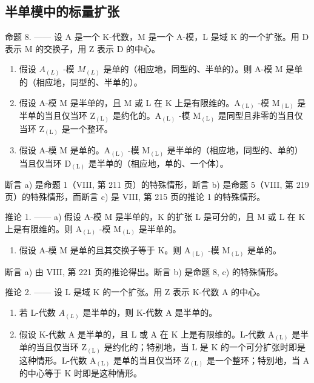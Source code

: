 \subsection{半单模中的标量扩张}

命题 8. —— 设 A 是一个 K-代数，M 是一个 A-模，L 是域 K 的一个扩张。用 D 表示 M 的交换子，用 Z 表示 D 的中心。

\begin{enumerate}
\def\labelenumi{\alph{enumi})}
\item
  假设 \(A_{(L)}\) -模 \(M_{(L)}\) 是单的（相应地，同型的、半单的）。则 A-模 M 是单的（相应地，同型的、半单的）。
\item
  假设 A-模 M 是半单的，且 M 或 L 在 K 上是有限维的。\(\mathrm{A}_{(\mathrm{L})}\) -模 \(\mathrm{M}_{(\mathrm{L})}\) 是半单的当且仅当环 \(\mathrm{Z}_{(\mathrm{L})}\) 是约化的。\(\mathrm{A}_{(\mathrm{L})}\) -模 \(\mathrm{M}_{(\mathrm{L})}\) 是同型且非零的当且仅当环 \(\mathrm{Z}_{(\mathrm{L})}\) 是一个整环。
\item
  假设 A-模 M 是单的。\(\mathrm{A}_{(\mathrm{L})}\) -模 \(\mathrm{M}_{(\mathrm{L})}\) 是半单的（相应地，同型的、单的）当且仅当环 \(\mathrm{D}_{(\mathrm{L})}\) 是半单的（相应地，单的、一个体）。
\end{enumerate}

断言 a) 是命题 1（VIII, 第 211 页）的特殊情形，断言 b) 是命题 5（VIII, 第 219 页）的特殊情形，而断言 c) 是 VIII, 第 215 页的推论 1 的特殊情形。

推论 1. —— a) 假设 A-模 M 是半单的，K 的扩张 L 是可分的，且 M 或 L 在 K 上是有限维的。则 \(\mathrm{A}_{(\mathrm{L})}\) -模 \(\mathrm{M}_{(\mathrm{L})}\) 是半单的。

\begin{enumerate}
\def\labelenumi{\alph{enumi})}
\setcounter{enumi}{1}
\tightlist
\item
  假设 A-模 M 是单的且其交换子等于 K。则 \(\mathrm{A}_{(\mathrm{L})}\) -模 \(\mathrm{M}_{(\mathrm{L})}\) 是单的。
\end{enumerate}

断言 a) 由 VIII, 第 221 页的推论得出。断言 b) 是命题 8, c) 的特殊情形。

推论 2. —— 设 L 是域 K 的一个扩张。用 Z 表示 K-代数 A 的中心。

\begin{enumerate}
\def\labelenumi{\alph{enumi})}
\item
  若 L-代数 \(A_{(L)}\) 是半单的，则 K-代数 A 是半单的。
\item
  假设 K-代数 A 是半单的，且 L 或 A 在 K 上是有限维的。L-代数 \(\mathrm{A}_{(\mathrm{L})}\) 是半单的当且仅当环 \(\mathrm{Z}_{(\mathrm{L})}\) 是约化的；特别地，当 L 是 K 的一个可分扩张时即是这种情形。L-代数 \(\mathrm{A}_{(\mathrm{L})}\) 是单的当且仅当环 \(\mathrm{Z}_{(\mathrm{L})}\) 是一个整环；特别地，当 A 的中心等于 K 时即是这种情形。
\end{enumerate}


